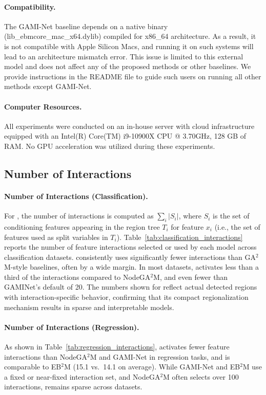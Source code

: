 \paragraph{Compatibility.}The GAMI-Net baseline depends on a native binary (lib\_ebmcore\_mac\_x64.dylib) compiled for x86\_64 architecture. As a result, it is not compatible with Apple Silicon Macs, and running it on such systems will lead to an architecture mismatch error. This issue is limited to this external model and does not affect any of the proposed methods or other baselines. We provide instructions in the README file to guide such users on running all other methods except GAMI-Net.

\paragraph{Computer Resources.}All experiments were conducted on an in-house server with cloud infrastructure equipped with an Intel(R) Core(TM) i9-10900X CPU @ 3.70GHz, 128 GB of RAM. No GPU acceleration was utilized during these experiments.

\subsection{Number of Interactions}

\paragraph{Number of Interactions (Classification).}
For \method{}, the number of interactions is computed as $\sum_i |S_i|$, where $S_i$ is the set of conditioning features appearing in the region tree $T_i$ for feature $x_i$ (i.e., the set of features used as split variables in $T_i$).
Table~\ref{tab:classification_interactions} reports the number of feature interactions selected or used by each model across classification datasets. \method{} consistently uses significantly fewer interactions than GA$^2$M-style baselines, often by a wide margin. In most datasets, \method{} activates less than a third of the interactions compared to NodeGA$^2$M, and even fewer than GAMINet’s default of 20. The numbers shown for \method{} reflect actual detected regions with interaction-specific behavior, confirming that its compact regionalization mechanism results in sparse and interpretable models. 

\paragraph{Number of Interactions (Regression).}
As shown in Table~\ref{tab:regression_interactions}, \method{} activates fewer feature interactions than NodeGA$^2$M and GAMI-Net in regression tasks, and is comparable to EB$^2$M (15.1 vs.\ 14.1 on average). While GAMI-Net and EB$^2$M use a fixed or near-fixed interaction set, and NodeGA$^2$M often selects over 100 interactions, \method{} remains sparse across datasets.

